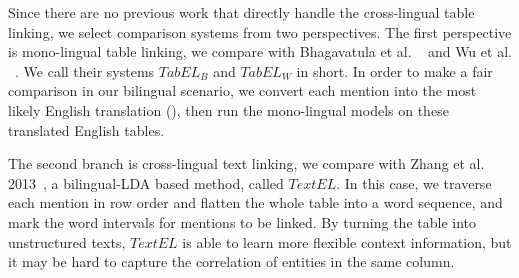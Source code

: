 Since there are no previous work that directly handle the cross-lingual table linking,
we select comparison systems from two perspectives.
The first perspective is mono-lingual table linking,
we compare with Bhagavatula et al. ~
and Wu et al. ~.
We call their systems $TabEL_B$ and $TabEL_W$ in short.
In order to make a fair comparison in our bilingual scenario,
we convert each mention into the most likely English translation (),
then run the mono-lingual models on these translated English tables.%

The second branch is cross-lingual text linking,
we compare with Zhang et al. 2013~,
a bilingual-LDA based method, called $TextEL$.
In this case, we traverse each mention in row order and flatten the whole table into a word sequence,
and mark the word intervals for mentions to be linked. 
By turning the table into unstructured texts,
$TextEL$ is able to learn more flexible context information,
but it may be hard to capture the correlation of entities in the same column.
